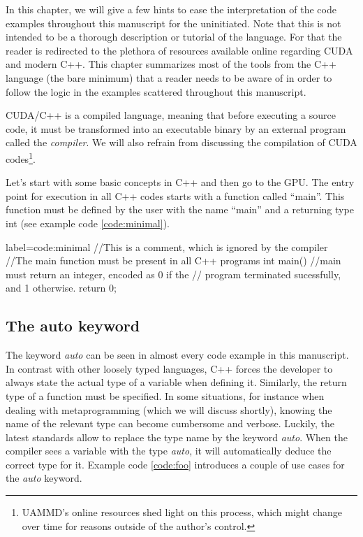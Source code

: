 \documentclass[twoside,openright,titlepage,numbers=noenddot,%
headinclude,footinclude,cleardoublepage=empty,abstract=on,
BCOR=5mm,fontsize=11pt, dvipsnames, paper=b5
]{scrreprt}
\newcommand{\uammd}{\gls{UAMMD}\xspace}
\newcommand{\gpu}{\gls{GPU}\xspace}
\begin{document}
In this chapter, we will give a few hints to ease the interpretation of the code examples throughout this manuscript for the uninitiated. Note that this is not intended to be a thorough description or tutorial of the language. For that the reader is redirected to the plethora of resources available online regarding CUDA and modern C++. This chapter summarizes most of the tools from the C++ language (the bare minimum) that a reader needs to be aware of in order to follow the logic in the examples scattered throughout this manuscript.

CUDA/C++ is a compiled language, meaning that before executing a source code, it must be transformed into an executable binary by an external program called the \emph{compiler}. We will also refrain from discussing the compilation of CUDA codes\footnote{\uammd's online resources shed light on this process, which might change over time for reasons outside of the author's control.}.

Let's start with some basic concepts in C++ and then go to the \gpu. The entry point for execution in all C++ codes starts with a function called ``main''. This function must be defined by the user with the name ``main'' and a returning type int (see example code \ref{code:minimal}).

\begin{code2}
{label=code:minimal}
//This is a comment, which is ignored by the compiler
//The main function must be present in all C++ programs
int main(){
  //main must return an integer, encoded as 0 if the
  // program terminated sucessfully, and 1 otherwise.
  return 0;
}
\end{code2}

\subsection*{The auto keyword}
The keyword \emph{auto} can be seen in almost every code example in this manuscript. In contrast with other loosely typed languages, C++ forces the developer to always state the actual type of a variable when defining it. Similarly, the return type of a function must be specified.
In some situations, for instance when dealing with metaprogramming (which we will discuss shortly), knowing the name of the relevant type can become cumbersome and verbose. Luckily, the latest standards allow to replace the type name by the keyword \emph{auto}. When the compiler sees a variable with the type \emph{auto}, it will automatically deduce the correct type for it. Example code \ref{code:foo} introduces a couple of use cases for the \emph{auto} keyword.
\end{document}
